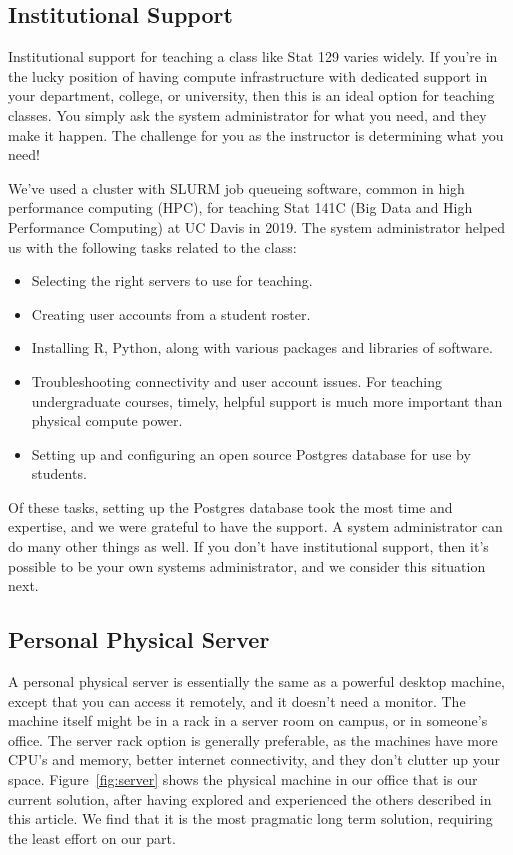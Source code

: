 \documentclass[12pt]{article}
\begin{document}
\subsection{Institutional Support}

Institutional support for teaching a class like Stat 129 varies widely.
If you're in the lucky position of having compute infrastructure with dedicated support in your department, college, or university, then this is an ideal option for teaching classes.
You simply ask the system administrator for what you need, and they make it happen.
The challenge for you as the instructor is determining what you need!

We've used a cluster with SLURM \cite{yoo2003slurm} job queueing software, common in high performance computing (HPC), for teaching Stat 141C (Big Data and High Performance Computing) at UC Davis in 2019.
The system administrator helped us with the following tasks related to the class:
\begin{itemize}
\item Selecting the right servers to use for teaching.
\item Creating user accounts from a student roster.
\item Installing R, Python, along with various packages and libraries of software.
\item Troubleshooting connectivity and user account issues.
    For teaching undergraduate courses, timely, helpful support is much more important than physical compute power.
\item Setting up and configuring an open source Postgres database for use by students.
\end{itemize}
Of these tasks, setting up the Postgres database took the most time and expertise, and we were grateful to have the support.
A system administrator can do many other things as well.
If you don't have institutional support, then it's possible to be your own systems administrator, and we consider this situation next.


\subsection{Personal Physical Server}

A personal physical server is essentially the same as a powerful desktop machine, except that you can access it remotely, and it doesn't need a monitor.
The machine itself might be in a rack in a server room on campus, or in someone's office.
The server rack option is generally preferable, as the machines have more CPU's and memory, better internet connectivity, and they don't clutter up your space.
Figure~\ref{fig:server} shows the physical machine in our office that is our current solution, after having explored and experienced the others described in this article.
We find that it is the most pragmatic long term solution, requiring the least effort on our part.
\end{document}

